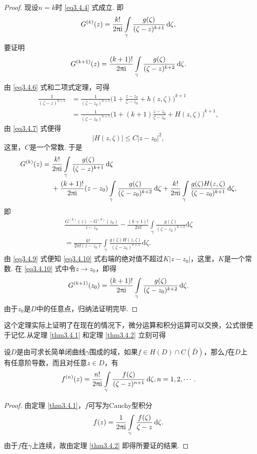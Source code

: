 \begin{proof}
  现设$n=k$时 \eqref{eq3.4.4} 式成立. 即
  \[
    G^{(k)}(z) = \frac{k!}{2\uppi\mathrm i}\int\limits_\gamma\frac{g(\zeta)}{(\zeta-z)^{k+1}}\mathop{}\!\mathrm{d} \zeta,
  \]
  要证明
  \[
    G^{(k+1)}(z) = \frac{(k+1)!}{2\uppi\mathrm i}\int\limits_\gamma\frac{g(\zeta)}{(\zeta-z)^{k+2}}\mathop{}\!\mathrm{d} \zeta.
  \]
  由 \eqref{eq3.4.6} 式和二项式定理，可得
  \begin{align*}
    \frac{1}{( \zeta -z) ^{k+1}} & = \frac{1}{( \zeta -z_0 ) ^{k+1}}\bigg( 1+\frac{z-z_0}{\zeta -z_0}+h( z,\zeta ) \bigg) ^{k+1}\\
    & = \frac{1}{( \zeta -z_0 ) ^{k+1}}\bigg( 1+(k+1)\frac{z-z_0}{\zeta -z_0}+H( z,\zeta ) \bigg) ^{k+1},
  \end{align*}
  由 \eqref{eq3.4.7} 式便得
  \begin{equation}\label{eq3.4.9}
    |H(z,\zeta)|\le C|z-z_0|^2,
  \end{equation}
  这里，$C$是一个常数. 于是
  \begin{align*}
    G^{(k)}(z) = {}& \frac{k!}{2\uppi\mathrm i}\int\limits_\gamma\frac{g(\zeta)}{(\zeta-z)^{k+1}}\mathop{}\!\mathrm{d} \zeta\\
    & +\frac{(k+1)!}{2\uppi\mathrm i}(z-z_0)\int\limits_\gamma\frac{g(\zeta)}{(\zeta-z_0)^{k+2}}
    \mathop{}\!\mathrm{d} \zeta+\frac{k!}{2\uppi\mathrm i}\int\limits_\gamma\frac{g(\zeta)H(z,\zeta)}{(\zeta-z_0)^{k+1}}
    \mathop{}\!\mathrm{d} \zeta,
  \end{align*}
  即
  \begin{equation}\label{eq3.4.10}
    \begin{gathered}
      \frac{G^{( k )}( z ) -G^{( k )}( z_0 )}{z-z_0}-\frac{( k+1 ) !}{2\pi\ii}\int\limits_{\gamma}{\frac{g( \zeta )}{( \zeta -z_0 ) ^{k+2}}\text{d}\zeta}\\
      = \frac{k!}{2\pi\ii ( z-z_0 )}\int\limits_{\gamma}{\frac{g( \zeta ) H( z,\zeta )}{( \zeta -z_0 ) ^{k+1}}\text{d}\zeta}.
    \end{gathered}
  \end{equation}
  由 \eqref{eq3.4.9} 式便知 \eqref{eq3.4.10} 式右端的绝对值不超过$K|z-z_0|$，这里，$K$是一个常数. 在 \eqref{eq3.4.10} 式中令$z\to z_0$，即得
  \[
    G^{(k+1)}(z_0) = \frac{(k+1)!}{2\uppi\mathrm i}\int\limits_\gamma\frac{g(\zeta)}{(\zeta-z_0)^{k+2}}\mathop{}\!\mathrm{d} \zeta.
  \]
  由于$z_0$是$D$中的任意点，归纳法证明完毕.
\end{proof}

这个定理实际上证明了在现在的情况下，微分运算和积分运算可以交换，公式很便于记忆.从定理 \ref{thm3.4.1} 和定理 \ref{thm3.4.2} 立刻可得
\begin{theorem}\label{thm3.4.3}
  设$D$是由可求长简单闭曲线$\gamma$围成的域，如果$f\in H(D)\cap C(\bar D)$，那么$f$在$D$上有任意阶导数，而且对任意$z\in D$，有
  \begin{equation*}
    f^{(n)}(z) = \frac{n!}{2\uppi\mathrm i}\int\limits_\gamma\frac{f(\zeta)}{(\zeta-z)^{n+1}}\mathop{}\!\mathrm{d} \zeta,n=1,2,\cdots.
  \end{equation*}
\end{theorem}
\begin{proof}
  由定理 \ref{thm3.4.1}，$f$可写为Cauchy型积分
  \[
    f(z) = \frac1{2\uppi\mathrm i}\int\limits_{\gamma}\frac{f(\zeta)}{\zeta-z}\mathop{}\!\mathrm{d} \zeta.
  \]
  由于$f$在$\gamma$上连续，故由定理 \ref{thm3.4.2} 即得所要证的结果.
\end{proof}

